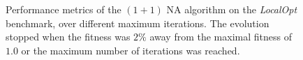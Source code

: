 \begin{figure}[h]
\begin{center}
    \end{center}
    \caption{Performance metrics of the $(1 + 1)$ NA algorithm on the \textit{LocalOpt} benchmark, over different maximum iterations.
    The evolution stopped when the fitness was $2\%$ away from the maximal fitness of $1.0$ or the maximum number of iterations was reached.}
    \label{fig:na_localopt}
\end{figure}

